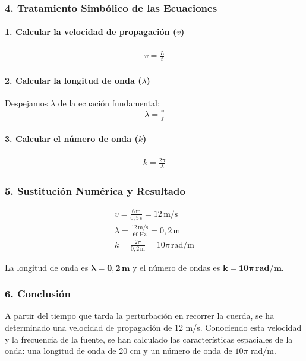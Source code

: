 \subsubsection*{4. Tratamiento Simbólico de las Ecuaciones}
\paragraph{1. Calcular la velocidad de propagación ($v$)}
\begin{gather}
    v = \frac{L}{t}
\end{gather}
\paragraph{2. Calcular la longitud de onda ($\lambda$)}
Despejamos $\lambda$ de la ecuación fundamental:
\begin{gather}
    \lambda = \frac{v}{f}
\end{gather}
\paragraph{3. Calcular el número de onda ($k$)}
\begin{gather}
    k = \frac{2\pi}{\lambda}
\end{gather}

\subsubsection*{5. Sustitución Numérica y Resultado}
\begin{gather}
    v = \frac{6\,\text{m}}{0,5\,\text{s}} = 12\,\text{m/s} \\
    \lambda = \frac{12\,\text{m/s}}{60\,\text{Hz}} = 0,2\,\text{m} \\
    k = \frac{2\pi}{0,2\,\text{m}} = 10\pi \, \text{rad/m}
\end{gather}
\begin{cajaresultado}
La longitud de onda es $\boldsymbol{\lambda=0,2\,\textbf{m}}$ y el número de ondas es $\boldsymbol{k=10\pi\,\textbf{rad/m}}$.
\end{cajaresultado}

\subsubsection*{6. Conclusión}
\begin{cajaconclusion}
A partir del tiempo que tarda la perturbación en recorrer la cuerda, se ha determinado una velocidad de propagación de 12 m/s. Conociendo esta velocidad y la frecuencia de la fuente, se han calculado las características espaciales de la onda: una longitud de onda de 20 cm y un número de onda de $10\pi$ rad/m.
\end{cajaconclusion}

